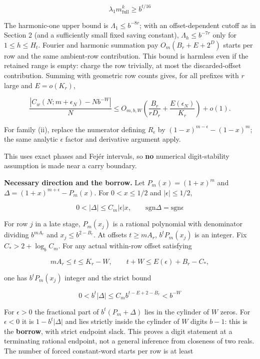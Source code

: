 \documentclass[11pt,a4paper]{article}
\begin{document}
\[
\lambda_1 m_{\mathrm{full}}^k\ge b^{t/16}
\]

The harmonic-one upper bound is \(\Lambda_1\le b^{-8r}\); with an
offset-dependent cutoff as in Section 2 (and a sufficiently small fixed
saving constant), \(\Lambda_h\le b^{-7r}\) only for \(1\le h\le H_t\).
Fourier and harmonic summation pay \(O_m(B_r+E+2^D)\) starts per row and
the same ambient-row contribution. This bound is harmless even if the
retained range is empty: charge the row trivially, at most the
discarded-offset contribution. Summing with geometric row counts gives,
for all prefixes with \(r\) large and \(E=o(K_r)\),

\[
\frac{|C_w(N;m+\epsilon_N)-Nb^{-W}|}{N} \le  O_{m,b,W}\left(\frac{B_r}{rD_r}+\frac{E(\epsilon_N)}{K_r}\right)+o(1).\tag{7.1}
\]

For family (ii), replace the numerator defining \(R_\epsilon\) by
\((1-x)^{m-\epsilon}-(1-x)^m\); the same analytic \(\epsilon\) factor
and derivative argument apply.

This uses exact phases and Fejér intervals, so \textbf{no} numerical
digit-stability assumption is made near a carry boundary.

\textbf{Necessary direction and the borrow.} Let \(P_m(x)=(1+x)^m\) and
\(\Delta=(1+x)^{m+\epsilon}-P_m(x)\). For \(0< x\le 1/2\) and
\(|\epsilon|\le 1/2\),

\[
0< |\Delta|\le C_m |\epsilon| x,\qquad \mathrm{sgn} \Delta=\mathrm{sgn} \epsilon
\]

For row \(j\) in a late stage, \(P_m(x_j)\) is a rational polynomial
with denominator dividing \(b^{m A_r}\) and \(x_j\le b^{2-B_r}\). At
offsets \(t\ge m A_r\), \(b^t P_m(x_j)\) is an integer. Fix
\(C_{\ast}>2+\log_b C_m\). For any actual within-row offset satisfying

\[
m A_r\le t\le K_r-W,\qquad t+W\le E(\epsilon)+B_r-C_{\ast},
\]

one has \(b^t P_m(x_j)\) integer and the strict bound

\[
0< b^t|\Delta|\le C_m b^{t-E+2-B_r}< b^{-W}
\]

For \(\epsilon>0\) the fractional part of \(b^t(P_m+\Delta)\) lies in
the cylinder of \(W\) zeros. For \(\epsilon< 0\) it is \(1-b^t|\Delta|\)
and lies strictly inside the cylinder of \(W\) digits \(b-1\): this is
the \textbf{borrow}, with strict endpoint slack. This proves a digit
statement at a terminating rational endpoint, not a general inference
from closeness of two reals. The number of forced constant-word starts
per row is at least
\end{document}

